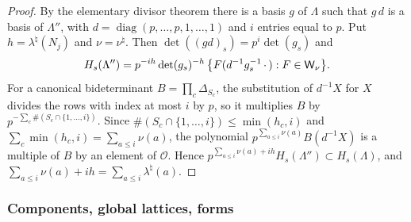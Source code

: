 \begin{proof}
By the elementary divisor theorem there is a basis $g$ of $\Lambda$ such that $g\,d$ is a basis of $\Lambda''$, with $d=\operatorname{diag}(p,\dots,p,1,\dots,1)$ and $i$ entries equal to $p$. Put $h=\lambda^\natural(N_j)$ and $\nu=\nu^\natural$. Then $\det((gd)_s)=p^i\det(g_s)$ and
\[
H_s(\Lambda'')=p^{-ih}\det(g_s)^{-h}\,\big\{F(d^{-1}g_s^{-1}\,\cdot\,):F\in\mathsf W_\nu\big\}.
\]
For a canonical bideterminant $B=\prod_c\Delta_{S_c}$, the substitution of $d^{-1}X$ for $X$ divides the rows with index at most $i$ by $p$, so it multiplies $B$ by $p^{-\sum_c\#(S_c\cap\{1,\dots,i\})}$. Since $\#(S_c\cap\{1,\dots,i\})\le\min(h_c,i)$ and $\sum_c\min(h_c,i)=\sum_{a\le i}\nu(a)$, the polynomial $p^{\sum_{a\le i}\nu(a)}B(d^{-1}X)$ is a multiple of $B$ by an element of $\mathcal O$. Hence $p^{\sum_{a\le i}\nu(a)+ih}H_s(\Lambda'')\subset H_s(\Lambda)$, and $\sum_{a\le i}\nu(a)+ih=\sum_{a\le i}\lambda^\natural(a)$.
\end{proof}

\subsubsection{Components, global lattices, forms}

